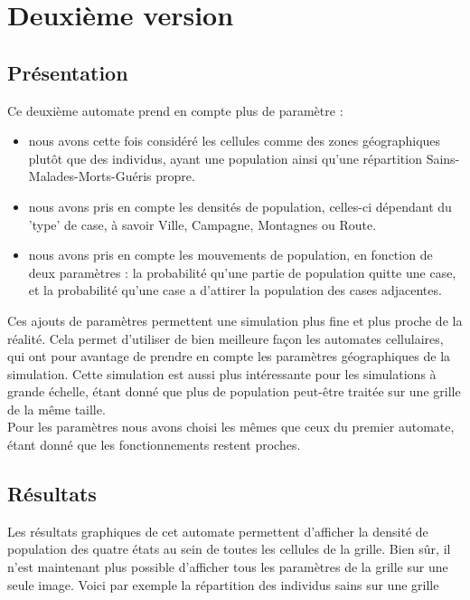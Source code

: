 \documentclass{article}
\begin{document}
	
	
\section{Deuxième version}

\subsection{Présentation}
	Ce deuxième automate prend en compte plus de paramètre : 
	\begin{itemize}
	\item nous avons cette fois considéré les cellules comme des zones géographiques plutôt que des individus, ayant une population ainsi qu'une répartition Sains-Malades-Morts-Guéris propre.
	\item nous avons pris en compte les densités de population, celles-ci dépendant du 'type' de case, à savoir Ville, Campagne, Montagnes ou Route.
	\item nous avons pris en compte les mouvements de population, en fonction de deux paramètres : la probabilité qu'une partie de population quitte une case, et la probabilité qu'une case a d'attirer la population des cases adjacentes.
	\end{itemize}
	
	Ces ajouts de paramètres permettent une simulation plus fine et plus proche de la réalité. Cela permet d'utiliser de bien meilleure façon les automates cellulaires, qui ont pour avantage de prendre en compte les paramètres géographiques de la simulation. Cette simulation est aussi plus intéressante pour les simulations à grande échelle, étant donné que plus de population peut-être traitée sur une grille de la même taille.\\

Pour les paramètres nous avons choisi les mêmes que ceux du premier automate, étant donné que les fonctionnements restent proches. 


\subsection{Résultats}

Les résultats graphiques de cet automate permettent d'afficher la densité de population des quatre états au sein de toutes les cellules de la grille. Bien sûr, il n'est maintenant plus possible d'afficher tous les paramètres de la grille sur une seule image. Voici par exemple la répartition des individus sains sur une grille \\[0.6cm]
\end{document}
